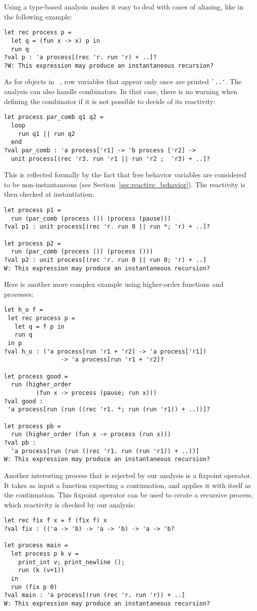 \documentclass[9pt,preprint]{sigplanconf}
\begin{document}
Using a type-based analysis makes it easy to deal with cases of aliasing, like in the following example:
\begin{lstlisting}
let rec process p =
  let q = (fun x -> x) p in
  run q 
?val p : 'a process[(rec 'r. run 'r) + ..]?
?W: This expression may produce an instantaneous recursion?
\end{lstlisting}
As for objects in \ocaml~\cite{Vouillon:2008}, row variables that appear only once are printed \verb+`..'+.
%
The analysis can also handle combinators. In that case, there is no warning when defining the combinator if it is not possible to decide of its reactivity:
\begin{lstlisting}
let process par_comb q1 q2 =
  loop
    run q1 || run q2
  end
?val par_comb : 'a process['r1] -> 'b process ['r2] ->
  unit process[(rec 'r3. run 'r1 || run 'r2 ;  'r3) + ..]?
\end{lstlisting}
%
This is reflected formally by the fact that free behavior variables are considered to be non-instantaneous (see Section~\ref{sec:reactive_behavior}). The reactivity is then checked at instantiation:
\begin{lstlisting}
let process p1 = 
  run (par_comb (process ()) (process (pause)))
?val p1 : unit process[(rec 'r. run 0 || run *; 'r) + ..]?

let process p2 = 
  run (par_comb (process ()) (process ()))
?val p2 : unit process[(rec 'r. run 0 || run 0; 'r) + ..]
W: This expression may produce an instantaneous recursion?
\end{lstlisting}

Here is another more complex example using higher-order functions and processes:
\begin{lstlisting}
let h_o f =
 let rec process p =
   let q = f p in
   run q
 in p
?val h_o : ('a process[run 'r1 + 'r2] -> 'a process['r1]) 
                -> 'a process[run 'r1 + 'r2]?

let process good = 
  run (higher_order 
         (fun x -> process (pause; run x)))
?val good :
 'a process[run (run ((rec 'r1. *; run (run 'r1)) + ..))]?

let process pb = 
  run (higher_order (fun x -> process (run x)))
?val pb :
  'a process[run (run ((rec 'r1. run (run 'r1)) + ..))]
W: This expression may produce an instantaneous recursion?
\end{lstlisting}

Another interesting process that is rejected by our analysis is a fixpoint operator. It takes as input a function expecting a continuation, and applies it with itself as the continuation. This fixpoint operator can be used to create a recursive process, which reactivity is checked by our analysis:
\begin{lstlisting}
let rec fix f x = f (fix f) x
?val fix : (('a -> 'b) -> 'a -> 'b) -> 'a -> 'b?

let process main =
  let process p k v =
    print_int v; print_newline (); 
    run (k (v+1))
  in
  run (fix p 0)
?val main : 'a process[(run (rec 'r. run 'r)) + ..]
W: This expression may produce an instantaneous recursion?
\end{lstlisting}
\end{document}

